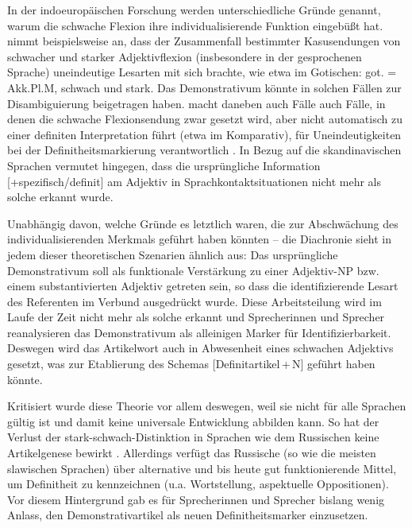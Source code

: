 In der indoeuropäischen Forschung werden unterschiedliche Gründe genannt, warum die schwache Flexion ihre individualisierende Funktion eingebüßt hat. \textcite[24]{Kovari1984} nimmt beispielsweise an, dass der Zusammenfall bestimmter Kasusendungen von schwacher und starker Adjektivflexion (insbesondere in der gesprochenen Sprache) uneindeutige Lesarten mit sich brachte, wie etwa im Gotischen: got.  = Akk.Pl.M, schwach und stark. Das Demonstrativum könnte in solchen Fällen zur Disambiguierung beigetragen haben.
\textcite[44]{Ebert1978} macht daneben \parencite[mit Verweis auf][]{Kuhn1955} auch Fälle auch Fälle, in denen die schwache Flexionsendung zwar gesetzt wird, aber nicht automatisch zu einer definiten Interpretation führt (etwa im Komparativ), für Uneindeutigkeiten bei der Definitheitsmarkierung verantwortlich \parencite[vgl. zu dieser Argumentation auch][25]{Kovari1984}. In Bezug auf die skandinavischen Sprachen vermutet \textcite{Braunmuller2013} hingegen, dass die ursprüngliche Information [+spezifisch/definit] am Adjektiv in Sprachkontaktsituationen nicht mehr als solche erkannt wurde. 

Unabhängig davon, welche Gründe es letztlich waren, die zur Abschwächung des individualisierenden Merkmals geführt haben könnten -- die Diachronie sieht in jedem dieser theoretischen Szenarien ähnlich aus: Das ursprüngliche Demonstrativum soll als funktionale Verstärkung zu einer Adjektiv-NP bzw. einem substantivierten Adjektiv getreten sein, so dass die identifizierende Lesart des Referenten im Verbund ausgedrückt wurde. Diese Arbeitsteilung wird im Laufe der Zeit nicht mehr als solche erkannt und Sprecherinnen und Sprecher reanalysieren das Demonstrativum als alleinigen Marker für Identifizierbarkeit. Deswegen wird das Artikelwort auch in Abwesenheit eines schwachen Adjektivs gesetzt, was zur Etablierung des Schemas [Definitartikel\,+\,N] geführt haben könnte.     

Kritisiert wurde diese Theorie vor allem deswegen, weil sie nicht für alle Sprachen gültig ist und damit keine universale Entwicklung abbilden kann. So hat der Verlust der stark-schwach-Distinktion in Sprachen wie dem Russischen keine Artikelgenese bewirkt \parencite[][64]{Philippi1997}. Allerdings verfügt das Russische (so wie die meisten slawischen Sprachen) über alternative und bis heute gut funktionierende Mittel, um Definitheit zu kennzeichnen (u.a. Wortstellung, aspektuelle Oppositionen). Vor diesem Hintergrund gab es für Sprecherinnen und Sprecher bislang wenig Anlass,  den Demonstrativartikel als neuen Definitheitsmarker einzusetzen.

